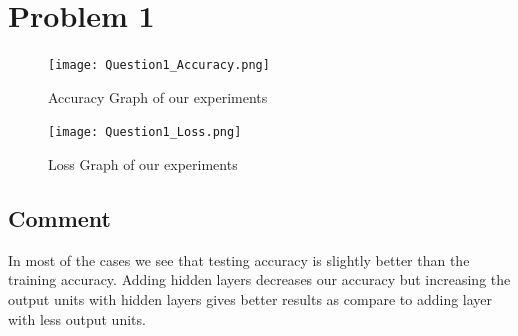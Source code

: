 \documentclass[paper=a4, fontsize=11pt]{scrartcl} %
\numberwithin{equation}{section} %
\numberwithin{figure}{section} %
\numberwithin{table}{section} %
\begin{document}

\section{Problem 1}






\begin{figure}[h]
\begin{center}
\texttt{[image: Question1\_Accuracy.png]}
\end{center}
\caption{Accuracy Graph of our experiments}
\label{fig:demo}
\end{figure}

\pagebreak


\begin{figure}[h]
\begin{center}
\texttt{[image: Question1\_Loss.png]}
\end{center}
\caption{Loss Graph of our experiments}
\label{fig:demo}
\end{figure}

\subsection{Comment} 
 In most of the cases we see that testing accuracy is slightly better than the training accuracy. Adding  hidden layers decreases our accuracy but increasing the output units with hidden layers gives better results as compare to adding layer with less output units.
\end{document}
